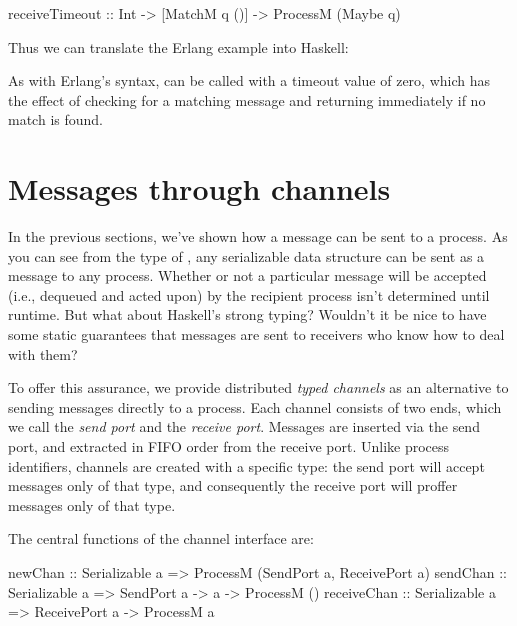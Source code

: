 \documentclass[preprint]{sigplanconf}
\begin{document}
\begin{code}
receiveTimeout :: Int -> [MatchM q ()] -> 
														ProcessM (Maybe q)
\end{code}

\noindent
Thus we can translate the Erlang example into Haskell:


As with Erlang's  syntax,  can be called with a timeout value of zero, which has the effect of checking for a matching message and returning immediately if no match is found.

\section{Messages through channels}
\label{s:Channels}

In the previous sections, we've shown how a message can be sent to a process. As you can see from the type of , any serializable data structure can be sent as a message to any process. Whether or not a particular message will be accepted (i.e., dequeued and acted upon) by the recipient process isn't determined until runtime. But what about Haskell's strong typing? Wouldn't it be nice to have some static guarantees that messages are sent to receivers who know how to deal with them?

To offer this assurance, we provide distributed {\em typed channels} as an alternative to sending messages directly to a process. Each channel consists of two ends, which we call the {\em send port} and the {\em receive port}. Messages are inserted via the send port, and extracted in FIFO order from the receive port. Unlike process identifiers, channels are created with a specific type: the send port will accept messages only of that type, and consequently the receive port will proffer messages only of that type.

The central functions of the channel interface are:
\par{\small
\begin{code}
newChan  :: Serializable a 
         => ProcessM (SendPort a, ReceivePort a)
sendChan :: Serializable a => SendPort a -> a -> ProcessM ()
receiveChan :: Serializable a => ReceivePort a -> ProcessM a
\end{code}}
\end{document}
